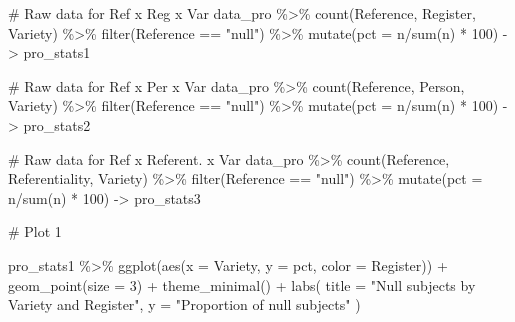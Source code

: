\documentclass[
  11pt,
  letterpaper,
  DIV=11,
  numbers=noendperiod]{scrreprt}
\newenvironment{Shaded}{\begin{snugshade}}{\end{snugshade}}
\newcommand{\AttributeTok}[1]{\textcolor[rgb]{0.40,0.45,0.13}{#1}}
\newcommand{\CommentTok}[1]{\textcolor[rgb]{0.37,0.37,0.37}{#1}}
\newcommand{\DecValTok}[1]{\textcolor[rgb]{0.68,0.00,0.00}{#1}}
\newcommand{\FunctionTok}[1]{\textcolor[rgb]{0.28,0.35,0.67}{#1}}
\newcommand{\NormalTok}[1]{\textcolor[rgb]{0.00,0.23,0.31}{#1}}
\newcommand{\OtherTok}[1]{\textcolor[rgb]{0.00,0.23,0.31}{#1}}
\newcommand{\SpecialCharTok}[1]{\textcolor[rgb]{0.37,0.37,0.37}{#1}}
\newcommand{\StringTok}[1]{\textcolor[rgb]{0.13,0.47,0.30}{#1}}
\begin{document}
\begin{Shaded}
\begin{Highlighting}[]
\CommentTok{\# Raw data for Ref x Reg x Var}
\NormalTok{data\_pro }\SpecialCharTok{\%\textgreater{}\%} 
  \FunctionTok{count}\NormalTok{(Reference, Register, Variety) }\SpecialCharTok{\%\textgreater{}\%} 
  \FunctionTok{filter}\NormalTok{(Reference }\SpecialCharTok{==} \StringTok{"null"}\NormalTok{) }\SpecialCharTok{\%\textgreater{}\%} 
  \FunctionTok{mutate}\NormalTok{(}\AttributeTok{pct =}\NormalTok{ n}\SpecialCharTok{/}\FunctionTok{sum}\NormalTok{(n) }\SpecialCharTok{*} \DecValTok{100}\NormalTok{) }\OtherTok{{-}\textgreater{}}\NormalTok{ pro\_stats1}

\CommentTok{\# Raw data for Ref x Per x Var}
\NormalTok{data\_pro }\SpecialCharTok{\%\textgreater{}\%} 
  \FunctionTok{count}\NormalTok{(Reference, Person, Variety) }\SpecialCharTok{\%\textgreater{}\%} 
  \FunctionTok{filter}\NormalTok{(Reference }\SpecialCharTok{==} \StringTok{"null"}\NormalTok{) }\SpecialCharTok{\%\textgreater{}\%} 
  \FunctionTok{mutate}\NormalTok{(}\AttributeTok{pct =}\NormalTok{ n}\SpecialCharTok{/}\FunctionTok{sum}\NormalTok{(n) }\SpecialCharTok{*} \DecValTok{100}\NormalTok{) }\OtherTok{{-}\textgreater{}}\NormalTok{ pro\_stats2}

\CommentTok{\# Raw data for Ref x Referent. x Var}
\NormalTok{data\_pro }\SpecialCharTok{\%\textgreater{}\%} 
  \FunctionTok{count}\NormalTok{(Reference, Referentiality, Variety) }\SpecialCharTok{\%\textgreater{}\%} 
  \FunctionTok{filter}\NormalTok{(Reference }\SpecialCharTok{==} \StringTok{"null"}\NormalTok{) }\SpecialCharTok{\%\textgreater{}\%} 
  \FunctionTok{mutate}\NormalTok{(}\AttributeTok{pct =}\NormalTok{ n}\SpecialCharTok{/}\FunctionTok{sum}\NormalTok{(n) }\SpecialCharTok{*} \DecValTok{100}\NormalTok{) }\OtherTok{{-}\textgreater{}}\NormalTok{ pro\_stats3}

\CommentTok{\# Plot 1}

\NormalTok{pro\_stats1 }\SpecialCharTok{\%\textgreater{}\%}
  \FunctionTok{ggplot}\NormalTok{(}\FunctionTok{aes}\NormalTok{(}\AttributeTok{x =}\NormalTok{ Variety, }\AttributeTok{y =}\NormalTok{ pct, }\AttributeTok{color =}\NormalTok{ Register)) }\SpecialCharTok{+}
  \FunctionTok{geom\_point}\NormalTok{(}\AttributeTok{size =} \DecValTok{3}\NormalTok{) }\SpecialCharTok{+}
  \FunctionTok{theme\_minimal}\NormalTok{() }\SpecialCharTok{+}
  \FunctionTok{labs}\NormalTok{(}
    \AttributeTok{title =} \StringTok{"Null subjects by Variety and Register"}\NormalTok{,}
    \AttributeTok{y =} \StringTok{"Proportion of null subjects"}
\NormalTok{  )}
\end{Highlighting}
\end{Shaded}
\end{document}
